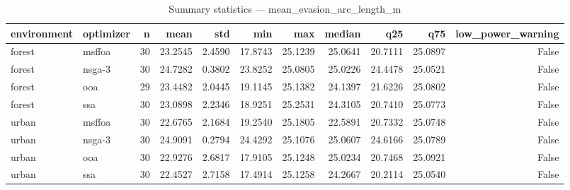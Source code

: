 \begin{table}
\caption{Summary statistics — mean_evasion_arc_length_m}
\label{tab:online_summary-mean_evasion_arc_length_m}
\begin{tabular}{llrrrrrrrrr}
\toprule
environment & optimizer & n & mean & std & min & max & median & q25 & q75 & low\_power\_warning \\
\midrule
forest & msffoa & 30 & 23.2545 & 2.4590 & 17.8743 & 25.1239 & 25.0641 & 20.7111 & 25.0897 & False \\
forest & nsga-3 & 30 & 24.7282 & 0.3802 & 23.8252 & 25.0805 & 25.0226 & 24.4478 & 25.0521 & False \\
forest & ooa & 29 & 23.4482 & 2.0445 & 19.1145 & 25.1382 & 24.1397 & 21.6226 & 25.0802 & False \\
forest & ssa & 30 & 23.0898 & 2.2346 & 18.9251 & 25.2531 & 24.3105 & 20.7410 & 25.0773 & False \\
urban & msffoa & 30 & 22.6765 & 2.1684 & 19.2540 & 25.1805 & 22.5891 & 20.7332 & 25.0748 & False \\
urban & nsga-3 & 30 & 24.9091 & 0.2794 & 24.4292 & 25.1076 & 25.0607 & 24.6166 & 25.0789 & False \\
urban & ooa & 30 & 22.9276 & 2.6817 & 17.9105 & 25.1248 & 25.0234 & 20.7468 & 25.0921 & False \\
urban & ssa & 30 & 22.4527 & 2.7158 & 17.4914 & 25.1258 & 24.2667 & 20.2114 & 25.0540 & False \\
\bottomrule
\end{tabular}
\end{table}
